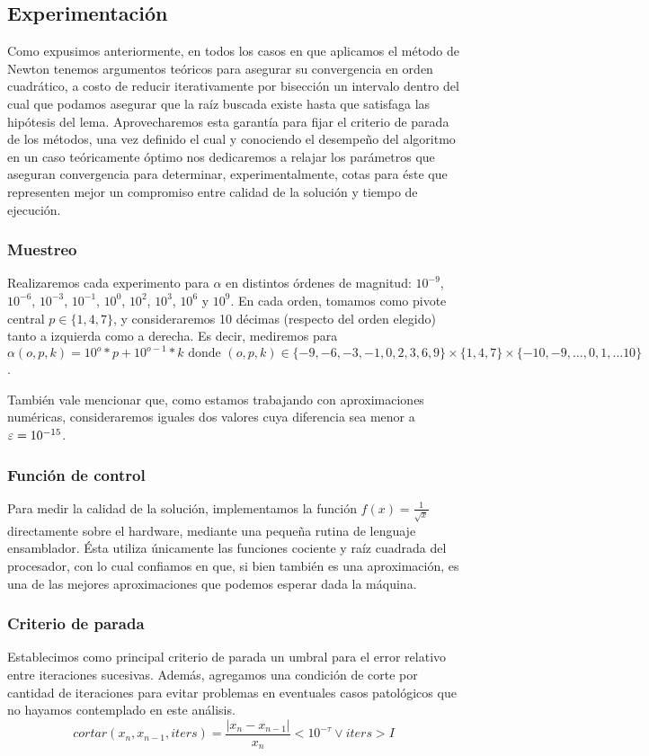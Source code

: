 \subsection{Experimentación}
	
Como expusimos anteriormente, en todos los casos en que aplicamos el método de Newton tenemos argumentos teóricos para asegurar su convergencia en orden cuadrático, a costo de reducir iterativamente por bisección un intervalo dentro del cual que podamos asegurar que la raíz buscada existe hasta que satisfaga las hipótesis del lema. Aprovecharemos esta garantía para fijar el criterio de parada de los métodos, una vez definido el cual y conociendo el desempeño del algoritmo en un caso teóricamente óptimo nos dedicaremos a relajar los parámetros que aseguran convergencia para determinar, experimentalmente, cotas para éste que representen mejor un compromiso entre calidad de la solución y tiempo de ejecución.

	\subsubsection{Muestreo}
Realizaremos cada experimento para $\alpha$ en distintos órdenes de magnitud: $10^{-9}$, $10^{-6}$, $10^{-3}$, $10^{-1}$, $10^{0}$, $10^{2}$, $10^{3}$, $10^{6}$ y $10^{9}$. En cada orden, tomamos como pivote central $p \in \{1,4,7\}$, y consideraremos 10 décimas (respecto del orden elegido) tanto a izquierda como a derecha. Es decir, mediremos para $ \alpha (o, p, k) = 10^o*p + 10^{o-1} * k \mbox{ donde } (o, p, k) \in \{-9, -6, -3, -1, 0, 2, 3, 6, 9\} \times \{1,4,7\} \times \{-10, -9, \dots , 0, 1,  \dots 10\} $.

También vale mencionar que, como estamos trabajando con aproximaciones numéricas, consideraremos iguales dos valores cuya diferencia sea menor a $\varepsilon = 10^{-15}$.

	\subsubsection{Función de control}
Para medir la calidad de la solución, implementamos la función $f(x) = \frac{1}{\sqrt{x}}$ directamente sobre el hardware, mediante una pequeña rutina de lenguaje ensamblador. Ésta utiliza únicamente las funciones cociente y raíz cuadrada del procesador, con lo cual confiamos en que, si bien también es una aproximación, es una de las mejores aproximaciones que podemos esperar dada la máquina.

	\subsubsection{Criterio de parada}
Establecimos como principal criterio de parada un umbral para el error relativo entre iteraciones sucesivas. Además, agregamos una condición de corte por cantidad de iteraciones para evitar problemas en eventuales casos patológicos que no hayamos contemplado en este análisis.
$$cortar(x_n, x_{n-1}, iters) = \frac{|x_n - x_{n-1}|}{x_n} < 10^{-\tau} \vee iters > I$$

